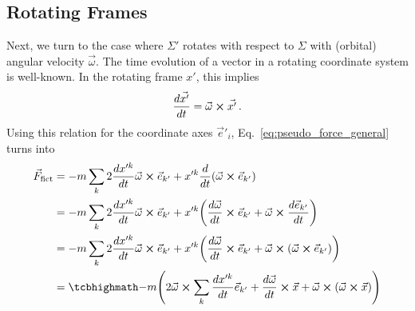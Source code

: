 \documentclass[../class_mech_main.tex]{subfiles}
\begin{document}
        \subsection{Rotating Frames}
Next, we turn to the case where $\Sigma'$ rotates with respect to $\Sigma$ with (orbital) angular velocity $\vec{\omega}$. The time evolution of a vector in a rotating coordinate system is well-known.  In the rotating frame $x'$, this implies
\begin{equation}
    \dv{\vec{x'}}{t} = \vec{\omega} \cross \vec{x'} \, .
\end{equation}
Using this relation for the coordinate axes $\vec{e}'_i$, Eq.~\eqref{eq:pseudo_force_general} turns into
\begin{align}
	\vec{F}_\mathrm{fict} &= - m \sum_k 2 \dv{x'^k}{t} \vec{\omega} \cross \unitvec{k'} + x'^k \dv{t} \qty(\vec{\omega} \cross \unitvec{k'})
	\notag\\
	&= - m \sum_k 2 \dv{x'^k}{t} \vec{\omega} \cross \unitvec{k'} + x'^k \qty(\dv{\vec{\omega}}{t} \cross \unitvec{k'} + \vec{\omega} \cross \dv{\unitvec{k'}}{t})
	\notag\\
	&= - m \sum_k 2 \dv{x'^k}{t} \vec{\omega} \cross \unitvec{k'} + x'^k \qty(\dv{\vec{\omega}}{t} \cross \unitvec{k'} + \vec{\omega} \cross (\vec{\omega} \cross \unitvec{k'}))
	\notag\\
	&= \eqbox{
		- m \qty(2 \vec{\omega} \cross \sum_k \dv{x'^k}{t} \unitvec{k'} + \dv{\vec{\omega}}{t} \cross \vec{x} + \vec{\omega} \cross (\vec{\omega} \cross \vec{x}))
	}
    \label{eq:pseudo_force_rot_frame}
\end{align}
\end{document}
